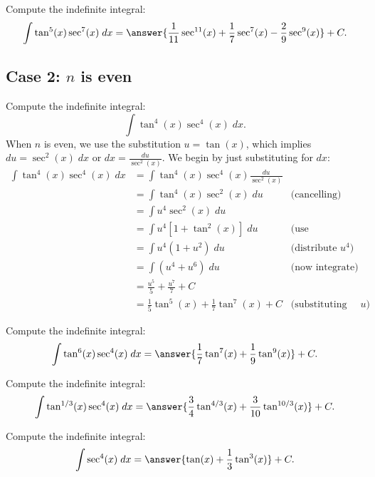 \documentclass{ximera}
\begin{document}
\begin{problem}
Compute the indefinite integral:
\[
\int \tan^5(x) \sec^7(x)\;dx = \answer{\frac{1}{11} \sec^{11}(x) + \frac17 \sec^7(x) -\frac29 \sec^9(x)} + C.
\]
\end{problem}



\subsection{Case 2: $n$ is even}
\begin{example}
Compute the indefinite integral:
\[
\int \tan^4(x) \sec^4(x)\;dx.
\]
When $n$ is even, we use the substitution $u = \tan(x)$,
which implies $du = \sec^2(x) \; dx$ or $dx = \frac{du}{\sec^2(x)}$.
We begin by just substituting for $dx$:
\begin{align*}
\int \tan^4(x) \sec^4(x)\;dx &= \int \tan^4(x) \sec^4(x) \frac{du}{\sec^2(x)}\\
&= \int \tan^4(x) \sec^2(x) \; du & \text{(cancelling)}\\
&= \int u^4 \sec^2(x) \; du \\
&= \int u^4\left[1 + \tan^2(x)\right] \; du & \text{(use Pythagorean identity)}\\
&= \int u^4(1+u^2) \; du & \text{(distribute $u^4$)}\\
&= \int (u^4 + u^6) \; du & \text{(now integrate)}\\
&=  \frac{u^5}{5} + \frac{u^7}{7} + C  \\
&= \frac15\tan^5(x)  + \frac17 \tan^7(x) + C & \text{(substituting for $u$)}
\end{align*}
\end{example}

\begin{problem}
Compute the indefinite integral:
\[
\int \tan^6(x) \sec^4(x)\;dx = \answer{\frac17 \tan^7(x) + \frac19 \tan^9(x)} + C.
\]
\end{problem}

\begin{problem}
Compute the indefinite integral:
\[
\int \tan^{1/3}(x) \sec^4(x)\;dx = \answer{\frac34 \tan^{4/3}(x) + \frac{3}{10} \tan^{10/3}(x)} + C.
\]
\end{problem}

\begin{problem}
Compute the indefinite integral:
\[
\int  \sec^4(x)\;dx = \answer{\tan(x) + \frac13 \tan^3(x)} + C.
\]
\end{problem}
\end{document}
